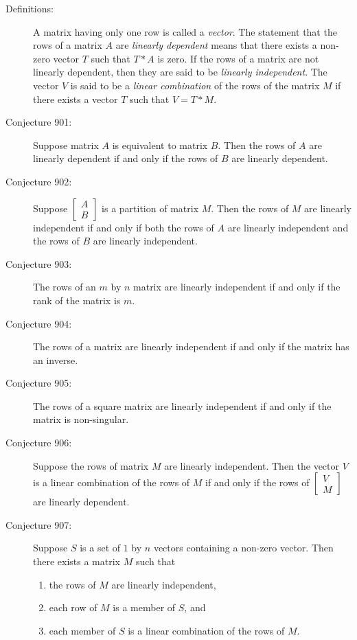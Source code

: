 \documentclass{article}
\begin{document}
\begin{description}

  \item[Definitions:] A matrix having only one row is called a \emph{vector}. The statement that the rows of a matrix $A$ are \emph{linearly dependent} means that there exists a non-zero vector $T$ such that $T*A$ is zero. If the rows of a matrix are not linearly dependent, then they are said to be \emph{linearly independent}. The vector $V$ is said to be a \emph{linear combination} of the rows of the matrix $M$ if there exists a vector $T$ such that $V=T*M$.

  \item[Conjecture 901:] Suppose matrix $A$ is equivalent to matrix $B$. Then the rows of $A$ are linearly dependent if and only if the rows of $B$ are linearly dependent.

  \item[Conjecture 902:] Suppose $ 
    \begin{bmatrix}
      A \\
      B
    \end{bmatrix}
    $ is a partition of matrix $M$. Then the rows of $M$ are linearly independent if and only if both the rows of $A$ are linearly independent and the rows of $B$ are linearly independent.

  \item[Conjecture 903:] The rows of an $m$ by $n$ matrix are linearly independent if and only if the rank of the matrix is $m$.

  \item[Conjecture 904:] The rows of a matrix are linearly independent if and only if the matrix has an inverse.

  \item[Conjecture 905:] The rows of a square matrix are linearly independent if and only if the matrix is non-singular.

  \item[Conjecture 906:] Suppose the rows of matrix $M$ are linearly independent. Then the vector $V$ is a linear combination of the rows of $M$ if and only if the rows of $ 
    \begin{bmatrix}
      V \\
      M
    \end{bmatrix}
    $ are linearly dependent.

  \item[Conjecture 907:] Suppose $S$ is a set of $1$ by $n$ vectors containing a non-zero vector. Then there exists a matrix $M$ such that
    \begin{enumerate}[\hspace{1cm}(1)]
      \item the rows of $M$ are linearly independent,
      \item each row of $M$ is a member of $S$, and
      \item each member of $S$ is a linear combination of the rows of $M$.
    \end{enumerate}


\end{description}
\end{document}
